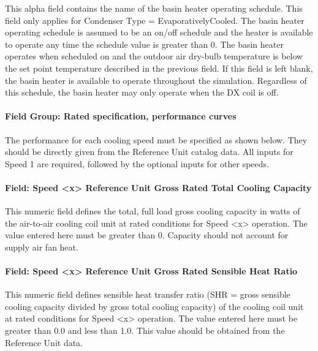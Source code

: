 This alpha field contains the name of the basin heater operating schedule. This field only applies for Condenser Type = EvaporativelyCooled. The basin heater operating schedule is assumed to be an on/off schedule and the heater is available to operate any time the schedule value is greater than 0. The basin heater operates when scheduled on and the outdoor air dry-bulb temperature is below the set point temperature described in the previous field. If this field is left blank, the basin heater is available to operate throughout the simulation. Regardless of this schedule, the basin heater may only operate when the DX coil is off.

\paragraph{Field Group: Rated specification, performance curves}\label{field-group-rated-specification-performance-curves}

The performance for each cooling speed must be specified as shown below. They should be directly given from the Reference Unit catalog data. All inputs for Speed 1 are required, followed by the optional inputs for other speeds.

\paragraph{Field: Speed \textless{}x\textgreater{} Reference Unit Gross Rated Total Cooling Capacity}\label{field-speed-x-reference-unit-gross-rated-total-cooling-capacity}

This numeric field defines the total, full load gross cooling capacity in watts of the air-to-air cooling coil unit at rated conditions for Speed \textless{}x\textgreater{} operation. The value entered here must be greater than 0. Capacity should not account for supply air fan heat.

\paragraph{Field: Speed \textless{}x\textgreater{} Reference Unit Gross Rated Sensible Heat Ratio}\label{field-speed-x-reference-unit-gross-rated-sensible-heat-ratio}

This numeric field defines sensible heat transfer ratio (SHR = gross sensible cooling capacity divided by gross total cooling capacity) of the cooling coil unit at rated conditions for Speed \textless{}x\textgreater{} operation. The value entered here must be greater than 0.0 and less than 1.0. This value should be obtained from the Reference Unit data.

